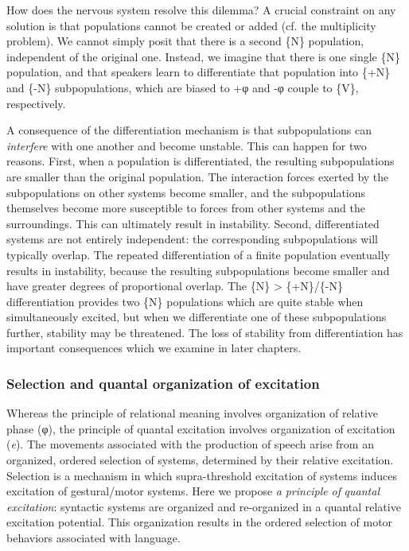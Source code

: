   How does the nervous system resolve this dilemma? A crucial constraint on any solution is that populations cannot be created or added (cf. the multiplicity problem). We cannot simply posit that there is a second \{N\} population, independent of the original one. Instead, we imagine that there is one single \{N\} population, and that speakers learn to differentiate that population into \{+N\} and \{-N\} subpopulations, which are biased to +φ and -φ couple to \{V\}, respectively.

  A consequence of the differentiation mechanism is that subpopulations can \textit{interfere} with one another and become unstable. This can happen for two reasons. First, when a population is differentiated, the resulting subpopulations are smaller than the original population. The interaction forces exerted by the subpopulations on other systems become smaller, and the subpopulations themselves become more susceptible to forces from other systems and the surroundings. This can ultimately result in instability. Second, differentiated systems are not entirely independent: the corresponding subpopulations will typically overlap. The repeated differentiation of a finite population eventually results in instability, because the resulting subpopulations become smaller and have greater degrees of proportional overlap. The \{N\} > \{+N\}/\{-N\} differentiation provides two \{N\} populations which are quite stable when simultaneously excited, but when we differentiate one of these subpopulations further, stability may be threatened. The loss of stability from differentiation has important consequences which we examine in later chapters.

\subsubsection{Selection and quantal organization of excitation}

Whereas the principle of relational meaning involves organization of relative phase (φ), the principle of quantal excitation involves organization of excitation (\textit{e}). The movements associated with the production of speech arise from an organized, ordered selection of systems, determined by their relative excitation. Selection is a mechanism in which supra-threshold excitation of systems induces excitation of gestural/motor systems. Here we propose \textit{a} \textit{principle} \textit{of} \textit{quantal} \textit{excitation}: syntactic systems are organized and re-organized in a quantal relative excitation potential. This organization results in the ordered selection of motor behaviors associated with language.

